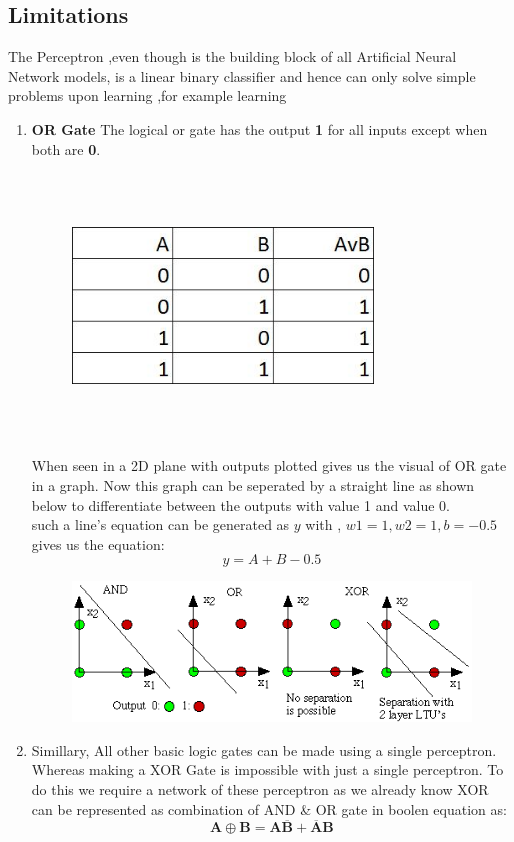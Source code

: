 \documentclass[12pt,times,a4paper]{report}
\begin{document}
{{\begin{normalsize}
\section{Limitations}
\par
The Perceptron ,even though is the building block of all Artificial Neural Network models, is a linear binary classifier and hence can only solve simple problems upon learning ,for example learning
\begin{enumerate}[label=(\Alph*)]
\item \textbf{OR Gate} The logical or gate has the output \textbf{1} for all inputs except when both are \textbf{0}.  
\begin{figure}[H]
\includegraphics[width=8cm,height=7cm,center]{orgate.jpg}
\caption{}
\end{figure}
When seen in a 2D plane with outputs plotted gives us the visual of OR gate in a graph. Now this graph can be seperated by a straight line as shown below to differentiate between the outputs with value 1 and value 0.\\
such a line's equation can be generated as $y$ with ,
$w 1=1, w 2=1, b=-0.5$ gives us the equation: $$y =A + B -0.5$$
\begin{figure}[H]
\includegraphics[center]{res.png}
\caption{}
\end{figure}
\item Simillary, All other basic logic gates can be made using a single perceptron. Whereas making a XOR Gate is impossible with just a single perceptron. To do this we require a network of these perceptron as we already know XOR can be represented as combination of AND \& OR gate in boolen equation as:
$$
\mathbf{A} \oplus \mathbf{B}=\mathbf{A} \overline{\mathbf{B}}+\overline{\mathbf{A}} \mathbf{B}
$$
\end{enumerate}


\end{normalsize}}}
\end{document}
